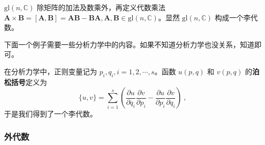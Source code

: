 \begin{example}{}
$\mathrm{gl}(n, \mathbb C)$ 除矩阵的加法及数乘外，再定义代数乘法 $\mathbf A\times \mathbf B=[\mathbf A, \mathbf B] = \mathbf A \mathbf B - \mathbf B\mathbf A, \mathbf A, \mathbf B\in \mathrm{gl}(n, \mathbb C)$。显然 $\mathrm{gl}(n,\mathbb C)$ 构成一个李代数。
\end{example}


下面一个例子需要一些分析力学中的内容。如果不知道分析力学也没关系，知道即可。
\begin{example}{}
在分析力学中，正则变量记为 $p_i,q_i, i=1,2,\cdots, s$。函数 $u(p,q)$ 和 $v(p, q)$ 的\textbf{泊松括号}定义为\begin{equation}
\{u, v\}=\sum_{i=1}^{s}\left(\frac{\partial u}{\partial q_{i}} \frac{\partial v}{\partial p_{i}}-\frac{\partial u}{\partial p_{i}} \frac{\partial v}{\partial q_{i}}\right)~,
\end{equation}
于是我们得到了一个李代数。




\end{example}

\subsubsection{外代数}

